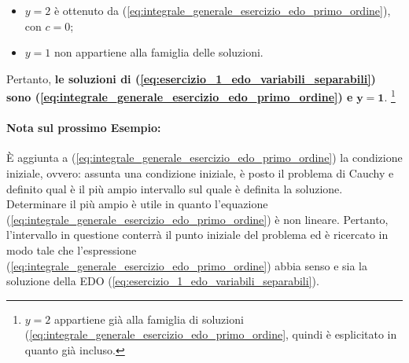 \begin{example}
\begin{enumerate}
\begin{itemize}
        \item $y=2$ è ottenuto da (\ref{eq:integrale_generale_esercizio_edo_primo_ordine}), con $c=0$;
        \item $y=1$ non appartiene alla famiglia delle soluzioni.
    \end{itemize}
    Pertanto, \textbf{le soluzioni di (\ref{eq:esercizio_1_edo_variabili_separabili}) sono (\ref{eq:integrale_generale_esercizio_edo_primo_ordine}) e} $\boldsymbol{y=1}$. \footnote{$y=2$ appartiene già alla famiglia di soluzioni (\ref{eq:integrale_generale_esercizio_edo_primo_ordine}, quindi è esplicitato in quanto già incluso.}
    \end{enumerate}
\end{example}

\paragraph{Nota sul prossimo Esempio:} È aggiunta a (\ref{eq:integrale_generale_esercizio_edo_primo_ordine}) la condizione iniziale, ovvero: assunta una condizione iniziale, è posto il problema di Cauchy e definito qual è il più ampio intervallo sul quale è definita la soluzione. Determinare il più ampio è utile in quanto l'equazione (\ref{eq:integrale_generale_esercizio_edo_primo_ordine}) è non lineare. Pertanto, l'intervallo in questione conterrà il punto iniziale del problema ed è ricercato in modo tale che l'espressione (\ref{eq:integrale_generale_esercizio_edo_primo_ordine}) abbia senso e sia la soluzione della EDO (\ref{eq:esercizio_1_edo_variabili_separabili}).

